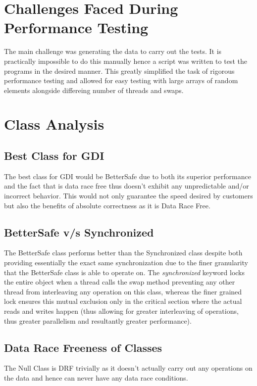 \section{Challenges Faced During Performance Testing}
The main challenge was generating the data to carry out the tests. It is practically impossible to do this manually hence a script was written to test the programs in the desired manner. This greatly simplified the task of rigorous performance testing and allowed for easy testing with large arrays of random elements alongside differeing number of threads and swaps. 

\section{Class Analysis}
\subsection{Best Class for GDI}
The best class for GDI would be BetterSafe due to both its superior performance and the fact that is data race free thus doesn't exhibit any unpredictable and/or incorrect behavior. This would not only guarantee the speed desired by customers but also the benefits of absolute correctness as it is Data Race Free. 

\subsection{BetterSafe v/s Synchronized}
The BetterSafe class performs better than the Synchronized class despite both providing essentially the exact same synchronization due to the finer granularity that the BetterSafe class is able to operate on. The \emph{synchronized} keyword locks the entire object when a thread calls the swap method preventing any other thread from interleaving any operation on this class, whereas the finer grained lock ensures this mutual exclusion only in the critical section where the actual reads and writes happen (thus allowing for greater interleaving of operations, thus greater parallelism and resultantly greater performance). 

\subsection{Data Race Freeness of Classes}
The Null Class is DRF trivially as it doesn't actually carry out any operations on the data and hence can never have any data race conditions. 

